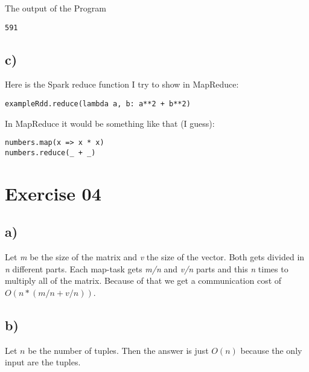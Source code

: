 \documentclass[11pt,a4paper]{scrartcl}
\begin{document}
The output of the Program

\begin{lstlisting}
591
\end{lstlisting}

\subsection*{c)}

Here is the Spark reduce function I try to show in MapReduce:

\begin{lstlisting}
exampleRdd.reduce(lambda a, b: a**2 + b**2)
\end{lstlisting}

In MapReduce it would be something like that (I guess):

\begin{lstlisting}
numbers.map(x => x * x)
numbers.reduce(_ + _)
\end{lstlisting}


\section*{Exercise 04}

\subsection*{a)}

Let \textit{m} be the size of the matrix and \textit{v} the size of the vector. Both gets divided in \textit{n} different parts. Each map-task gets \textit{m/n} and \textit{v/n} parts and this \textit{n} times to multiply all of the matrix. Because of that we get a communication cost of $O(n * (m/n + v/n))$.

\subsection*{b)}

Let $n$ be the number of tuples. Then the answer is just $O(n)$ because the only input are the tuples.
\end{document}
